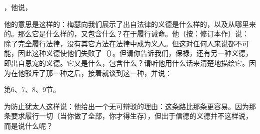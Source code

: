  ，他说，\par

他的意思是这样的：梅瑟向我们展示了出自法律的义德是什么样的，以及从哪里来的。那么它是什么样的，又包含什么？在于履行诫命。他（按：修订本作）说：  除了完全履行法律，没有其它方法在法律中成为义人。但这对任何人来说都不可能，因此这种义德使他们失败了（）。但请你告诉我们，保禄，还有另一种义德，即出自恩宠的义德。它又是什么，包含什么？请听他用什么话来清楚地描绘它。因为在他驳斥了那一种之后，接着就谈到这一种，并说：\par

第6、7、8、9节。\par

为防止犹太人这样说：他给出一个无可辩驳的理由：这条路比那条更容易。因为那条要求履行一切（当你做了全部，你才得生存），但出于信德的义德并不这样说，而是说什么呢？\par

